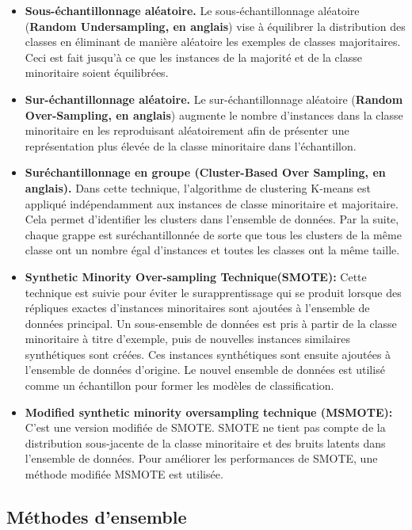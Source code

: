 \documentclass[12pt, french]{report}
\begin{document}
\begin{itemize}
\item \textbf{Sous-échantillonnage aléatoire.} Le sous-échantillonnage aléatoire (\textbf{Random Undersampling, en anglais})  vise à équilibrer la distribution des classes en éliminant de manière aléatoire les exemples de classes majoritaires. Ceci est fait jusqu'à ce que les instances de la majorité et de la classe minoritaire soient équilibrées.
\item \textbf{Sur-échantillonnage aléatoire.} Le sur-échantillonnage aléatoire (\textbf{Random Over-Sampling, en anglais}) augmente le nombre d'instances dans la classe minoritaire en les reproduisant aléatoirement afin de présenter une représentation plus élevée de la classe minoritaire dans l'échantillon.
\item \textbf{Suréchantillonnage en groupe (Cluster-Based Over Sampling, en anglais).}
Dans cette technique, l'algorithme de clustering K-means est appliqué indépendamment aux instances de classe minoritaire et majoritaire. Cela permet d'identifier les clusters dans l'ensemble de données. Par la suite, chaque grappe est suréchantillonnée de sorte que tous les clusters de la même classe ont un nombre égal d'instances et toutes les classes ont la même taille.
\item \textbf{Synthetic Minority Over-sampling Technique(SMOTE):}
Cette technique est suivie pour éviter le surapprentissage qui se produit lorsque des répliques exactes d'instances minoritaires sont ajoutées à l'ensemble de données principal. Un sous-ensemble de données est pris à partir de la classe minoritaire à titre d'exemple, puis de nouvelles instances similaires synthétiques sont créées. Ces instances synthétiques sont ensuite ajoutées à l'ensemble de données d'origine. Le nouvel ensemble de données est utilisé comme un échantillon pour former les modèles de classification.
\item \textbf{Modified synthetic minority oversampling technique (MSMOTE):}
C'est une version modifiée de SMOTE. SMOTE ne tient pas compte de la distribution sous-jacente de la classe minoritaire et des bruits latents dans l'ensemble de données. Pour améliorer les performances de SMOTE, une méthode modifiée MSMOTE est utilisée.
\end{itemize}

\subsection{Méthodes d'ensemble} \label{subsect:ensemblemethod}
\end{document}
